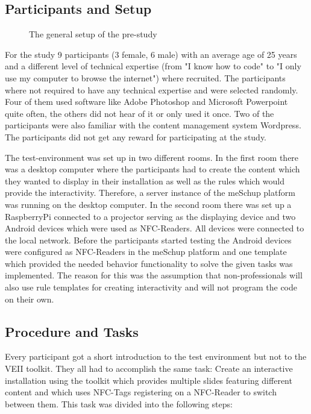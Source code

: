 \subsection{Participants and Setup}

\begin{figure}
\hfill
{}\hfill
\caption{The general setup of the pre-study}
\end{figure}

For the study 9 participants (3 female, 6 male) with an average age of 25 years and a different level of technical expertise (from "I know how to code" to "I only use my computer to browse the internet") where recruited. The participants where not required to have any technical expertise and were selected randomly. Four of them used software like Adobe Photoshop and Microsoft Powerpoint quite often, the others did not hear of it or only used it once. Two of the participants were also familiar with the content management system Wordpress. The participants did not get any reward for participating at the study.

The test-environment was set up in two different rooms. In the first room there was a desktop computer where the participants had to create the content which they wanted to display in their installation as well as the rules which would provide the interactivity. Therefore, a server instance of the meSchup platform was running on the desktop computer. In the second room there was set up a RaspberryPi connected to a projector serving as the displaying device and two Android devices which were used as NFC-Readers. All devices were connected to the local network. Before the participants started testing the Android devices were configured as NFC-Readers in the meSchup platform and one template which provided the needed behavior functionality to solve the given tasks was implemented. The reason for this was the assumption that non-professionals will also use rule templates for creating interactivity and will not program the code on their own.

\subsection{Procedure and Tasks}
Every participant got a short introduction to the test environment but not to the VEII toolkit. They all had to accomplish the same task: Create an interactive installation using the toolkit which provides multiple slides featuring different content and which uses NFC-Tags registering on a NFC-Reader to switch between them. This task was divided into the following steps:

